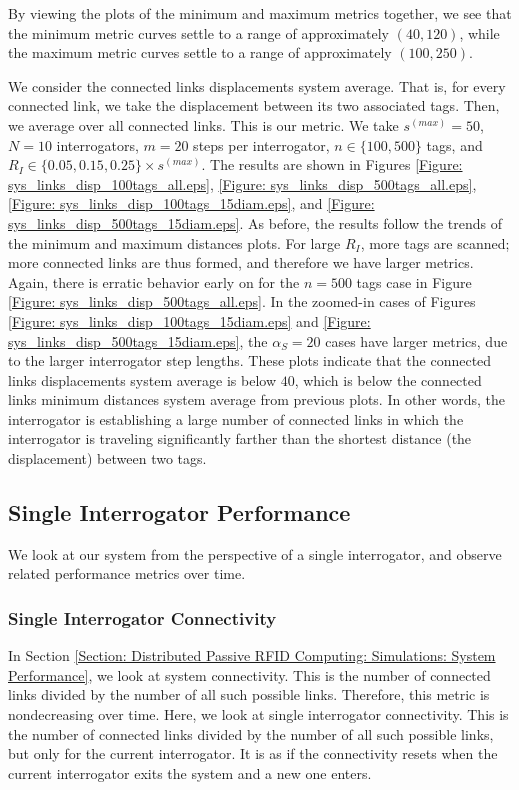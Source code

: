 By viewing the plots of the minimum and maximum metrics together, we see that the minimum metric curves settle to a range of approximately $\left(40, 120\right)$, while the maximum metric curves settle to a range of approximately $\left(100, 250\right)$.

We consider the connected links displacements system average. That is, for every connected link, we take the displacement between its two associated tags. Then, we average over all connected links. This is our metric. We take $s^{(max)} = 50$, $N = 10$ interrogators, $m = 20$ steps per interrogator, $n \in \{100, 500\}$ tags, and $R_I \in \{0.05, 0.15, 0.25\} \times s^{(max)}$. The results are shown in Figures \ref{Figure: sys_links_disp_100tags_all.eps}, \ref{Figure: sys_links_disp_500tags_all.eps}, \ref{Figure: sys_links_disp_100tags_15diam.eps}, and \ref{Figure: sys_links_disp_500tags_15diam.eps}. As before, the results follow the trends of the minimum and maximum distances plots. For large $R_I$, more tags are scanned; more connected links are thus formed, and therefore we have larger metrics. Again, there is erratic behavior early on for the $n = 500$ tags case in Figure \ref{Figure: sys_links_disp_500tags_all.eps}. In the zoomed-in cases of Figures \ref{Figure: sys_links_disp_100tags_15diam.eps} and \ref{Figure: sys_links_disp_500tags_15diam.eps}, the $\alpha_S = 20$ cases have larger metrics, due to the larger interrogator step lengths. These plots indicate that the connected links displacements system average is below $40$, which is below the connected links minimum distances system average from previous plots. In other words, the interrogator is establishing a large number of connected links in which the interrogator is traveling significantly farther than the shortest distance (the displacement) between two tags.

\subsection{Single Interrogator Performance}
\label{Section: Distributed Passive RFID Computing: Simulations: Single Interrogator Performance}
We look at our system from the perspective of a single interrogator, and observe related performance metrics over time.

\subsubsection{\textbf{Single Interrogator Connectivity}}
In Section \ref{Section: Distributed Passive RFID Computing: Simulations: System Performance}, we look at system connectivity. This is the number of connected links divided by the number of all such possible links. Therefore, this metric is nondecreasing over time. Here, we look at single interrogator connectivity. This is the number of connected links divided by the number of all such possible links, but only for the current interrogator. It is as if the connectivity resets when the current interrogator exits the system and a new one enters.

